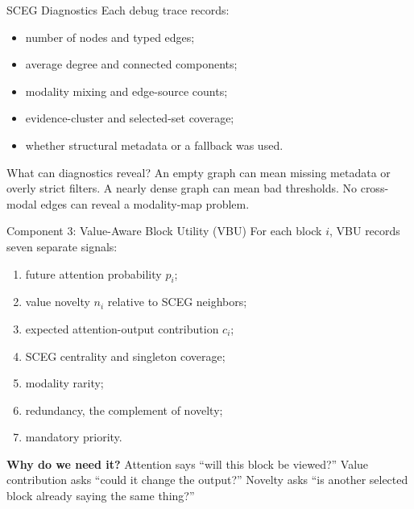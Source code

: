 \documentclass[aspectratio=169,10pt]{beamer}
\newcommand{\whylabel}{\textbf{Why do we need it?}}
\newcommand{\tightitems}{\setlength{\itemsep}{0.28em}\setlength{\parskip}{0pt}}
\begin{document}
\begin{frame}{SCEG Diagnostics}
\small
Each debug trace records:
\begin{itemize}\tightitems
  \item number of nodes and typed edges;
  \item average degree and connected components;
  \item modality mixing and edge-source counts;
  \item evidence-cluster and selected-set coverage;
  \item whether structural metadata or a fallback was used.
\end{itemize}
\begin{exampleblock}{What can diagnostics reveal?}
An empty graph can mean missing metadata or overly strict filters. A nearly dense graph can mean
bad thresholds. No cross-modal edges can reveal a modality-map problem.
\end{exampleblock}
\end{frame}

\begin{frame}{Component 3: Value-Aware Block Utility (VBU)}
\scriptsize
For each block $i$, VBU records seven separate signals:
\begin{enumerate}\tightitems
  \item future attention probability $p_i$;
  \item value novelty $n_i$ relative to SCEG neighbors;
  \item expected attention-output contribution $c_i$;
  \item SCEG centrality and singleton coverage;
  \item modality rarity;
  \item redundancy, the complement of novelty;
  \item mandatory priority.
\end{enumerate}
\begin{alertblock}{\whylabel}
Attention says ``will this block be viewed?'' Value contribution asks ``could it change the
output?'' Novelty asks ``is another selected block already saying the same thing?''
\end{alertblock}
\end{frame}
\end{document}
